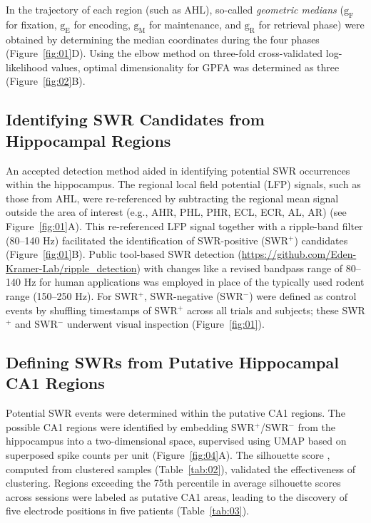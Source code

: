 In the trajectory of each region (such as AHL), so-called \textit{geometric medians} ($\mathrm{g_{F}}$ for fixation, $\mathrm{g_{E}}$ for encoding, $\mathrm{g_{M}}$ for maintenance, and $\mathrm{g_{R}}$ for retrieval phase) were obtained by determining the median coordinates during the four phases (Figure~\ref{fig:01}D). Using the elbow method on three-fold cross-validated log-likelihood values, optimal dimensionality for GPFA was determined as three (Figure~\ref{fig:02}B).

\subsection{Identifying SWR Candidates from Hippocampal Regions}
An accepted detection method \cite{liu_consensus_2022} aided in identifying potential SWR occurrences within the hippocampus. The regional local field potential (LFP) signals, such as those from AHL, were re-referenced by subtracting the regional mean signal outside the area of interest (e.g., AHR, PHL, PHR, ECL, ECR, AL, AR) (see Figure~\ref{fig:01}A). This re-referenced LFP signal together with a ripple-band filter (80--140 Hz) facilitated the identification of SWR-positive (SWR$^+$) candidates (Figure~\ref{fig:01}B). Public tool-based SWR detection (\url{https://github.com/Eden-Kramer-Lab/ripple_detection}) \cite{kay_hippocampal_2016} with changes like a revised bandpass range of 80--140 Hz for human applications \cite{norman_hippocampal_2019,norman_hippocampal_2021} was employed in place of the typically used rodent range (150--250 Hz). For SWR$^+$, SWR-negative (SWR$^-$) were defined as control events by shuffling timestamps of SWR$^+$ across all trials and subjects; these SWR$^+$ and SWR$^-$ underwent visual inspection (Figure~\ref{fig:01}).

\subsection{Defining SWRs from Putative Hippocampal CA1 Regions}
Potential SWR events were determined within the putative CA1 regions. The possible CA1 regions were identified by embedding SWR$^+$/SWR$^-$ from the hippocampus into a two-dimensional space, supervised using UMAP based on superposed spike counts per unit \cite{mcinnes_umap_2018} (Figure~\ref{fig:04}A). The silhouette score \cite{rousseeuw_silhouettes_1987}, computed from clustered samples (Table~\ref{tab:02}), validated the effectiveness of clustering. Regions exceeding the 75th percentile in average silhouette scores across sessions were labeled as putative CA1 areas, leading to the discovery of five electrode positions in five patients (Table~\ref{tab:03}). 

